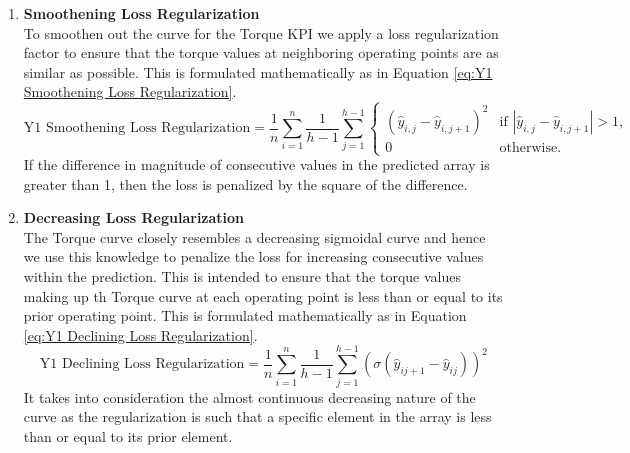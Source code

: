 \documentclass{report} %
\begin{document}
\begin{enumerate}
\item \textbf{Smoothening Loss Regularization} \\
To smoothen out the curve for the Torque \ac{KPI} we apply a loss regularization factor to ensure that the torque values at neighboring operating points are 
as similar as possible. This is formulated mathematically as in Equation \ref{eq:Y1 Smoothening Loss Regularization}.
\begin{equation}
    \text{Y1 Smoothening Loss Regularization} = \frac{1}{n} \sum_{i=1}^{n} \frac{1}{h-1} \sum_{j=1}^{h-1}
    \begin{cases} 
        \left( \hat{y}_{i,j} - \hat{y}_{i,j+1}  \right)^2 & \text{if } |\hat{y}_{i,j} - \hat{y}_{i,j+1}| > 1, \\
        0 & \text{otherwise}.
    \end{cases}
    \label{eq:Y1 Smoothening Loss Regularization}
\end{equation}
If the difference in magnitude of consecutive values in the predicted array is greater than 1, then the loss is penalized by the square of the difference.
\item \textbf{Decreasing Loss Regularization} \\
The Torque curve closely resembles a decreasing sigmoidal curve and hence we use this knowledge to penalize the loss for increasing consecutive values within the prediction. 
This is intended to ensure that the torque values making up th Torque curve at each operating point is less than or equal to its prior operating point.
This is formulated mathematically as in Equation \ref{eq:Y1 Declining Loss Regularization}.
\begin{equation}
    \text{Y1 Declining Loss Regularization} = \frac{1}{n} \sum_{i=1}^{n}\frac{1}{h-1} \sum_{j=1}^{h-1} \left(\sigma(\hat{y}_{i{j+1}} - \hat{y}_{ij})\right)^2
    \label{eq:Y1 Declining Loss Regularization}
\end{equation} 
It takes into consideration the almost continuous decreasing nature of the curve as the regularization is such that a specific element in the array is less than or 
equal to its prior element.
\end{enumerate}
\end{document}
